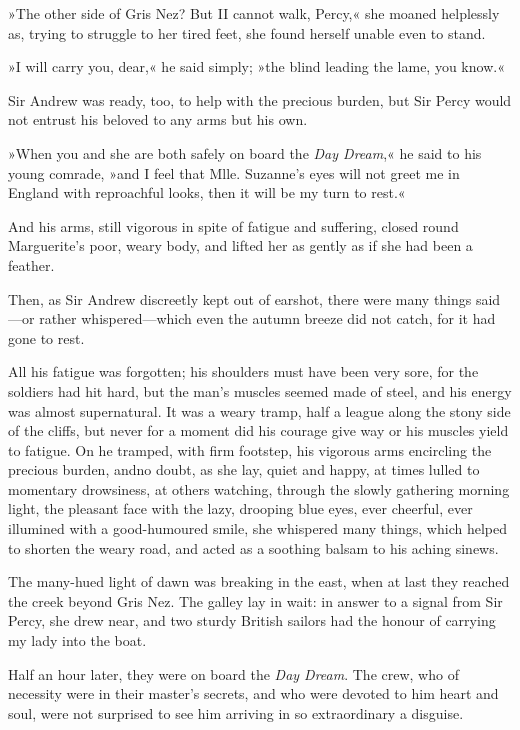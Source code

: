 »The other side of Gris Nez? But I\textellipsis \allowbreak  I cannot walk, Percy,« she moaned helplessly as, trying to struggle to her tired feet, she found herself unable even to stand.

»I will carry you, dear,« he said simply; »the blind leading the lame, you know.«

Sir Andrew was ready, too, to help with the precious burden, but Sir Percy would not entrust his beloved to any arms but his own.

»When you and she are both safely on board the \textit{Day Dream},« he said to his young comrade, »and I feel that Mlle. Suzanne's eyes will not greet me in England with reproachful looks, then it will be my turn to rest.«

And his arms, still vigorous in spite of fatigue and suffering, closed round Marguerite's poor, weary body, and lifted her as gently as if she had been a feather.

Then, as Sir Andrew discreetly kept out of earshot, there were many things said—or rather whispered—which even the autumn breeze did not catch, for it had gone to rest.

All his fatigue was forgotten; his shoulders must have been very sore, for the soldiers had hit hard, but the man's muscles seemed made of steel, and his energy was almost supernatural. It was a weary tramp, half a league along the stony side of the cliffs, but never for a moment did his courage give way or his muscles yield to fatigue. On he tramped, with firm footstep, his vigorous arms encircling the precious burden, and\textellipsis \allowbreak  no doubt, as she lay, quiet and happy, at times lulled to momentary drowsiness, at others watching, through the slowly gathering morning light, the pleasant face with the lazy, drooping blue eyes, ever cheerful, ever illumined with a good-humoured smile, she whispered many things, which helped to shorten the weary road, and acted as a soothing balsam to his aching sinews.

The many-hued light of dawn was breaking in the east, when at last they reached the creek beyond Gris Nez. The galley lay in wait: in answer to a signal from Sir Percy, she drew near, and two sturdy British sailors had the honour of carrying my lady into the boat.

Half an hour later, they were on board the \textit{Day Dream}. The crew, who of necessity were in their master's secrets, and who were devoted to him heart and soul, were not surprised to see him arriving in so extraordinary a disguise.

